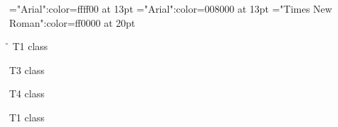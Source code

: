 \font\tdtcta="Arial":color=ffff00 at 13pt
\font\tcta="Arial":color=008000 at 13pt
\font\ta="Times New Roman":color=ff0000 at 20pt
 \r\n
\ta T1 class 

\tcta T3 class 

\tdtcta T4 class 

\ta T1 class 


\bye
